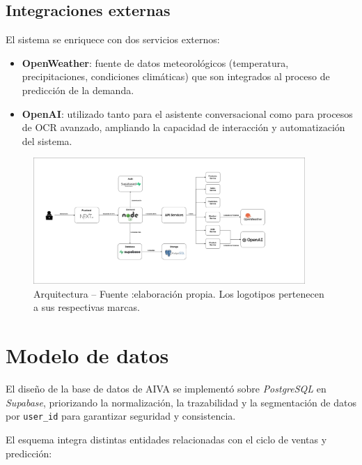 \subsection{Integraciones externas}

El sistema se enriquece con dos servicios externos:
\begin{itemize}
    \item \textbf{OpenWeather}: fuente de datos meteorológicos (temperatura, precipitaciones, condiciones climáticas) que son integrados al proceso de predicción de la demanda.
    \item \textbf{OpenAI}: utilizado tanto para el asistente conversacional como para procesos de OCR avanzado, ampliando la capacidad de interacción y automatización del sistema.
\end{itemize}


\begin{figure}[!htbp]
  \centering
  \includegraphics[width=0.92\textwidth]{images/arquitecturaAIVA.png} %
  \caption{Arquitectura -- Fuente :elaboración propia. Los logotipos pertenecen a sus respectivas marcas.}
  \label{fig:arquitectura-aiva}
\end{figure}
\vspace{1cm}

\section{Modelo de datos}

El diseño de la base de datos de AIVA se implementó sobre \textit{PostgreSQL} en \textit{Supabase}, priorizando la normalización, la trazabilidad y la segmentación de datos por \texttt{user\_id} para garantizar seguridad y consistencia.

El esquema integra distintas entidades relacionadas con el ciclo de ventas y predicción:

